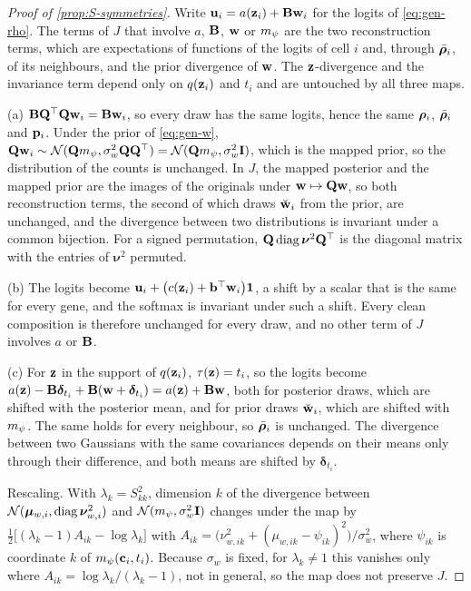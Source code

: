 \begin{proof}[Proof of \cref{prop:S-symmetries}]
Write $\mathbf{u}_i = a(\mathbf{z}_i) + \mathbf{B}\mathbf{w}_i$ for the logits of \cref{eq:gen-rho}. The terms of $J$ that involve $a$, $\mathbf{B}$, $\mathbf{w}$ or $m_{\psi}$ are the two reconstruction terms, which are expectations of functions of the logits of cell $i$ and, through $\bar{\boldsymbol{\rho}}_i$, of its neighbours, and the prior divergence of $\mathbf{w}$. The $\mathbf{z}$-divergence and the invariance term depend only on $q(\mathbf{z}_i)$ and $t_i$ and are untouched by all three maps.

(a) $\mathbf{B}\mathbf{Q}^\top\mathbf{Q}\mathbf{w}_i = \mathbf{B}\mathbf{w}_i$, so every draw has the same logits, hence the same $\boldsymbol{\rho}_i$, $\bar{\boldsymbol{\rho}}_i$ and $\mathbf{p}_i$. Under the prior of \cref{eq:gen-w}, $\mathbf{Q}\mathbf{w}_i \sim \mathcal{N}(\mathbf{Q}m_{\psi}, \sigma_w^2\mathbf{Q}\mathbf{Q}^\top) = \mathcal{N}(\mathbf{Q}m_{\psi}, \sigma_w^2\mathbf{I})$, which is the mapped prior, so the distribution of the counts is unchanged. In $J$, the mapped posterior and the mapped prior are the images of the originals under $\mathbf{w} \mapsto \mathbf{Q}\mathbf{w}$, so both reconstruction terms, the second of which draws $\breve{\mathbf{w}}_i$ from the prior, are unchanged, and the divergence between two distributions is invariant under a common bijection. For a signed permutation, $\mathbf{Q}\operatorname{diag}\boldsymbol{\nu}^2\mathbf{Q}^\top$ is the diagonal matrix with the entries of $\boldsymbol{\nu}^2$ permuted.

(b) The logits become $\mathbf{u}_i + \big(c(\mathbf{z}_i) + \mathbf{b}^\top\mathbf{w}_i\big)\mathbf{1}$, a shift by a scalar that is the same for every gene, and the softmax is invariant under such a shift. Every clean composition is therefore unchanged for every draw, and no other term of $J$ involves $a$ or $\mathbf{B}$.

(c) For $\mathbf{z}$ in the support of $q(\mathbf{z}_i)$, $\tau(\mathbf{z}) = t_i$, so the logits become $a(\mathbf{z}) - \mathbf{B}\boldsymbol{\delta}_{t_i} + \mathbf{B}(\mathbf{w} + \boldsymbol{\delta}_{t_i}) = a(\mathbf{z}) + \mathbf{B}\mathbf{w}$, both for posterior draws, which are shifted with the posterior mean, and for prior draws $\breve{\mathbf{w}}_i$, which are shifted with $m_{\psi}$. The same holds for every neighbour, so $\bar{\boldsymbol{\rho}}_i$ is unchanged. The divergence between two Gaussians with the same covariances depends on their means only through their difference, and both means are shifted by $\boldsymbol{\delta}_{t_i}$.

Rescaling. With $\lambda_k = S_{kk}^2$, dimension $k$ of the divergence between $\mathcal{N}(\boldsymbol{\mu}_{w,i}, \operatorname{diag}\boldsymbol{\nu}_{w,i}^2)$ and $\mathcal{N}(m_{\psi}, \sigma_w^2\mathbf{I})$ changes under the map by $\tfrac12\big[(\lambda_k - 1)A_{ik} - \log\lambda_k\big]$ with $A_{ik} = \big(\nu_{w,ik}^2 + (\mu_{w,ik} - \psi_{ik})^2\big)/\sigma_w^2$, where $\psi_{ik}$ is coordinate $k$ of $m_{\psi}(\mathbf{c}_i, t_i)$. Because $\sigma_w$ is fixed, for $\lambda_k \neq 1$ this vanishes only where $A_{ik} = \log\lambda_k/(\lambda_k - 1)$, not in general, so the map does not preserve $J$.


\end{proof}
